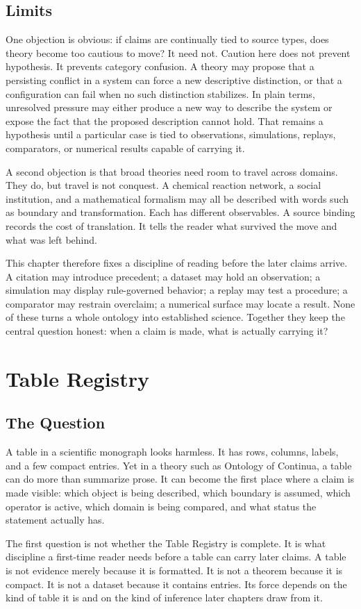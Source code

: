 \documentclass[11pt,a4paper,openany]{book}
\begin{document}
\subsection{Limits}
One objection is obvious: if claims are continually tied to source types, does theory become too cautious to move? It need not. Caution here does not prevent hypothesis. It prevents category confusion. A theory may propose that a persisting conflict in a system can force a new descriptive distinction, or that a configuration can fail when no such distinction stabilizes. In plain terms, unresolved pressure may either produce a new way to describe the system or expose the fact that the proposed description cannot hold. That remains a hypothesis until a particular case is tied to observations, simulations, replays, comparators, or numerical results capable of carrying it. \cite{haken_synergetics,nicolis_prigogine_selforg}\par
A second objection is that broad theories need room to travel across domains. They do, but travel is not conquest. A chemical reaction network, a social institution, and a mathematical formalism may all be described with words such as boundary and transformation. Each has different observables. A source binding records the cost of translation. It tells the reader what survived the move and what was left behind.\par
This chapter therefore fixes a discipline of reading before the later claims arrive. A citation may introduce precedent; a dataset may hold an observation; a simulation may display rule-governed behavior; a replay may test a procedure; a comparator may restrain overclaim; a numerical surface may locate a result. None of these turns a whole ontology into established science. Together they keep the central question honest: when a claim is made, what is actually carrying it?\par
\section{Table Registry}
\subsection{The Question}
A table in a scientific monograph looks harmless. It has rows, columns, labels, and a few compact entries. Yet in a theory such as Ontology of Continua, a table can do more than summarize prose. It can become the first place where a claim is made visible: which object is being described, which boundary is assumed, which operator is active, which domain is being compared, and what status the statement actually has. \cite{nicolis_prigogine_selforg,kauffman_autocatalytic}\par
The first question is not whether the Table Registry is complete. It is what discipline a first-time reader needs before a table can carry later claims. A table is not evidence merely because it is formatted. It is not a theorem because it is compact. It is not a dataset because it contains entries. Its force depends on the kind of table it is and on the kind of inference later chapters draw from it.\par
\end{document}

